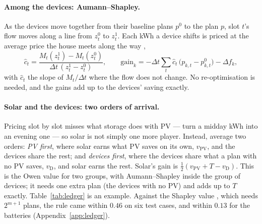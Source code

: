 \documentclass[11pt,a4paper]{article}
\newcommand{\dt}{\Delta t}
\begin{document}
\paragraph{Among the devices: Aumann--Shapley.} As the devices move together from
their baseline plans $p^0$ to the plan $p$, slot $t$'s flow moves along a line
from $z^0_t$ to $z^1_t$. Each kWh a device shifts is priced at the average price
the house meets along the way \cite{aumannshapley1974},
\[
  \hat c_t = \frac{M_t(z^1_t) - M_t(z^0_t)}{\dt\,(z^1_t - z^0_t)},\qquad
  \text{gain}_k = -\dt\textstyle\sum_t \hat c_t\,\big(p_{k,t} - p^0_{k,t}\big) - \Delta f_k ,
\]
with $\hat c_t$ the slope of $M_t/\dt$ where the flow does not change. No re-optimisation
is needed, and the gains add up to the devices' saving exactly.

\paragraph{Solar and the devices: two orders of arrival.} Pricing slot by slot
misses what storage does with PV --- turn a midday kWh into an evening one --- so
solar is not simply one more player. Instead, average two orders: \emph{PV first},
where solar earns what PV saves on its own, $v_{\mathrm{PV}}$, and the devices
share the rest; and \emph{devices first}, where the devices share what a plan
with no PV saves, $v_{\mathrm D}$, and solar earns the rest. Solar's gain is
$\tfrac12(v_{\mathrm{PV}} + T - v_{\mathrm D})$. This is the Owen value
\cite{owen1977} for two groups, with Aumann--Shapley inside the group of devices;
it needs one extra plan (the devices with no PV) and adds up to $T$ exactly.
Table~\ref{tab:ledger} is an example. Against the Shapley value \cite{shapley1953},
which needs $2^{m+1}$ plans, the rule came within $0.46$ on six test cases, and
within $0.13$ for the batteries (Appendix~\ref{app:ledger}).
\end{document}
